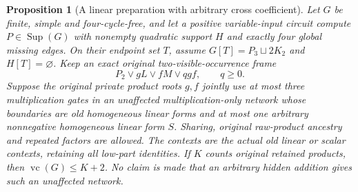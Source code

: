 \documentclass[11pt]{article}
\newcommand{\Sup}{\operatorname{Sup}}
\newcommand{\vc}{\operatorname{vc}}
\newtheorem{proposition}[theorem]{Proposition}
\theoremstyle{definition}
\theoremstyle{remark}
\begin{document}
\begin{proposition}[A linear preparation with arbitrary cross coefficient]\label{prop:pathpurelineargeneral}
Let $G$ be finite, simple and four-cycle-free, and let a positive variable-input circuit compute $P\in\Sup(G)$ with nonempty quadratic support $H$ and exactly four global missing edges. On their endpoint set $T$, assume $G[T]=P_3\sqcup2K_2$ and $H[T]=\varnothing$. Keep an exact original two-visible-occurrence frame
\[
                  P_2\vee gL\vee fM\vee qgf,\qquad q\ge0.
\]
Suppose the original private product roots $g,f$ jointly use at most three multiplication gates in an unaffected multiplication-only network whose boundaries are old homogeneous linear forms and at most one arbitrary nonnegative homogeneous linear form $S$. Sharing, original raw-product ancestry and repeated factors are allowed. The contexts are the actual old linear or scalar contexts, retaining all low-part identities. If $K$ counts original retained products, then $\vc(G)\le K+2$. No claim is made that an arbitrary hidden addition gives such an unaffected network.
\end{proposition}
\end{document}
